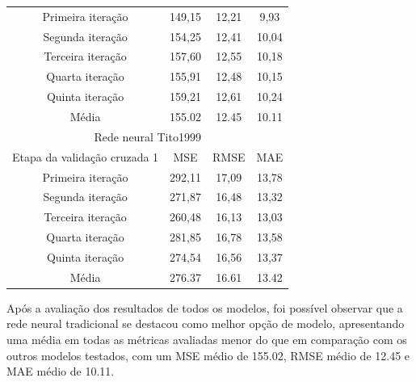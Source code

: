 \begin{table}[htbp]
\begin{tabular}{|c|c|c|c|}
        Primeira iteração & 149,15 & 12,21 & 9,93 \\ 
        Segunda iteração & 154,25 & 12,41 & 10,04 \\ 
        Terceira iteração & 157,60 & 12,55 & 10,18 \\ 
        Quarta iteração & 155,91 & 12,48 & 10,15 \\ 
        Quinta iteração & 159,21 & 12,61 & 10,24 \\ 
        Média & 155.02 & 12.45 & 10.11 \\
        \hline
        \multicolumn{4}{|c|}{Rede neural Tito1999} \\ \hline
        Etapa da validação cruzada 1 & MSE & RMSE & MAE \\ \hline
        Primeira iteração & 292,11 & 17,09 & 13,78 \\ 
        Segunda iteração & 271,87 & 16,48 & 13,32 \\ 
        Terceira iteração & 260,48 & 16,13 & 13,03 \\ 
        Quarta iteração & 281,85 & 16,78 & 13,58 \\ 
        Quinta iteração & 274,54 & 16,56 & 13,37 \\ 
        Média & 276.37 & 16.61 & 13.42 \\
        \hline
    \end{tabular}
\end{table}
\newpage
Após a avaliação dos resultados de todos os modelos, foi possível observar que a rede neural tradicional se destacou como melhor opção de modelo, apresentando uma média em todas as métricas avaliadas menor do que em comparação com os outros modelos testados, com um MSE médio de 155.02, RMSE médio de 12.45 e MAE médio de 10.11.